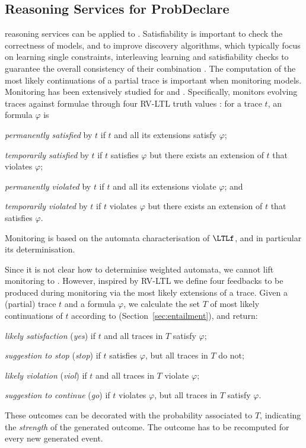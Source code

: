 \subsection*{Reasoning Services for ProbDeclare}

\PLTL reasoning services can be applied to \pdeclare. Satisfiability is important to 
check the correctness of \pdeclare models, and to improve discovery algorithms, which typically 
focus on learning single constraints, interleaving learning and satisfiability checks to guarantee 
the overall consistency of their combination \cite{DMMM17}.
%
The computation of the most likely continuations of a partial trace is important when monitoring 
\pdeclare models. Monitoring has been extensively studied for \declare and \LTLf. Specifically, \cite{DDGM14} 
monitors evolving traces against \LTLf formulae through four RV-LTL truth values 
\cite{Bauer2010:LTL}: for a trace $t$, an \LTLf formula $\varphi$ is
\begin{inparaenum}[\it (i)]
\item \emph{permanently satisfied} by $t$ if $t$ and all its extensions satisfy $\varphi$;
\item \emph{temporarily satisfied} by $t$ if $t$ satisfies $\varphi$ but there exists an extension of $t$ that violates $\varphi$;
\item \emph{permanently violated} by $t$ if $t$ and all its extensions violate $\varphi$; and
\item \emph{temporarily violated} by $t$ if $t$ violates $\varphi$ but there exists an extension of $t$ that satisfies $\varphi$.
\end{inparaenum}
Monitoring is based on the automata characterisation of $\LTLf$, and in particular its determinisation.

Since it is not clear how to determinise weighted automata, we cannot lift monitoring to 
\PLTL. However, inspired by RV-LTL we define four feedbacks to be produced during monitoring via 
the most likely extensions of a trace. Given a (partial) trace $t$ and a \PLTL formula $\varphi$, 
we calculate the set $T$ of most likely continuations of $t$ according to \pdeclare 
(Section~\ref{sec:entailment}), and return:
\begin{inparaenum}[\it (i)]
\item \emph{likely satisfaction} (\emph{yes}) if $t$ and all traces in $T$ satisfy $\varphi$;
\item \emph{suggestion to stop} (\emph{stop}) if $t$ satisfies $\varphi$, but all traces in $T$ do not;
\item \emph{likely violation} (\emph{viol}) if $t$ and all traces in $T$ violate $\varphi$;
\item \emph{suggestion to continue} (\emph{go}) if $t$ violates $\varphi$, but all traces in $T$ satisfy $\varphi$.
\end{inparaenum}
These outcomes can be decorated with the probability associated to $T$, indicating the
\emph{strength} of the generated outcome.
The outcome has to be recomputed for every new generated event.

